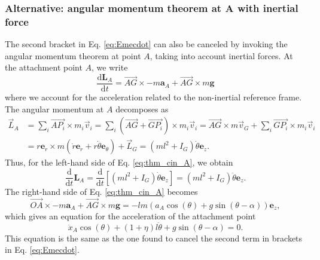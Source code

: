 \documentclass[11pt,a4paper]{exam}
\newcommand{\ezACDH}{\bm e_z}
\newcommand{\erACDH}{\bm e_r}
\newcommand{\etACDH}{\bm e_\theta}
\begin{document}
\begin{parts}
    \subsubsection*{Alternative: angular momentum theorem at A with inertial force}
    The second bracket in Eq. \eqref{eq:Emecdot} can also be canceled by invoking the angular momentum theorem at point $A$, taking into account inertial forces.
    At the attachment point $A$, we write
    \begin{equation}
        \frac{\mathrm d \bm{L}_A}{\mathrm d t} = \overrightarrow{AG}\times-m\bm a_A + \overrightarrow{AG}\times m\bm g
        \label{eq:thm_cin_A}
    \end{equation}
    where we account for the acceleration related to the non-inertial reference frame.
    The angular momentum at $A$ decomposes as
    \begin{align*}
        \vec L_A &= \sum_i \overrightarrow{AP_i}\times m_i \vec v_i = \sum_i \left(\overrightarrow{AG}+\overrightarrow{GP_i}\right)\times m_i \vec v_i = \overrightarrow{AG}\times m \vec v_G + \sum_i\overrightarrow{GP_i}\times m_i \vec v_i \\
        &= r \erACDH \times m(\dot r \erACDH + r\dot\theta \etACDH) + \vec L_G = (ml^2 + I_G) \dot\theta \ezACDH.
    \end{align*}
    Thus, for the left-hand side of Eq. \eqref{eq:thm_cin_A}, we obtain
    $$
    \frac{\mathrm d }{\mathrm d t}\bm L_A = \frac{\mathrm d }{\mathrm d t}\left[\left(ml^2+I_G\right)\dot\theta\ezACDH\right] = \left(ml^2+I_G\right)\ddot\theta\ezACDH.
    $$
    The right-hand side of Eq. \eqref{eq:thm_cin_A} becomes
    $$
    \overrightarrow{OA}\times-m\bm a_A + \overrightarrow{AG}\times m\bm g=-lm(a_A\cos(\theta) + g\sin(\theta-\alpha))\ezACDH,
    $$
    which gives an equation for the acceleration of the attachment point
    \begin{equation}
        \ddot x_A \cos(\theta) + (1+\eta) l \ddot\theta + g\sin(\theta-\alpha) = 0.
        \label{eq:a_A}
    \end{equation}
    This equation is the same as the one found to cancel the second term in brackets in Eq. \eqref{eq:Emecdot}.

\end{parts}
\end{document}
